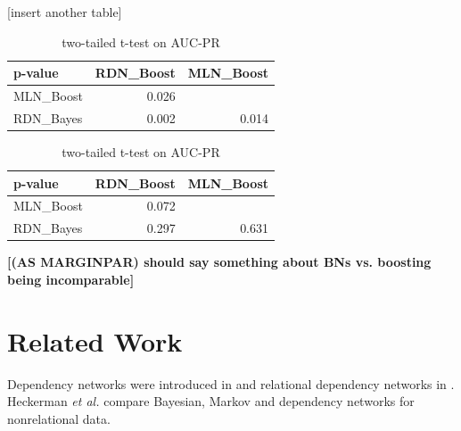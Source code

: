 \documentclass[runningheads,a4paper]{llncs}
\renewcommand{\marginpar}[1]{\fixneeded{(AS MARGINPAR) #1}}
\newcommand{\fixneeded}[1]{\textbf{[\footnotesize #1]}}
\begin{document}
 [insert another table]
\begin{table}[!htb]
    \begin{minipage}{.5\linewidth}
      \caption{ two-tailed  t-test  on CLL}
      \centering
        \begin{tabular}{|l|r|r|} \hline
    \textbf{p-value} &RDN\_Boost   &MLN\_Boost    \\ \hline
    MLN\_Boost &0.026  &             \\
    RDN\_Bayes & 0.002 & 0.014  \\ \hline
    \end{tabular}%
  \label{table:ttestcll}%
    \end{minipage}%
    \begin{minipage}{.5\linewidth}
      \centering
        \caption{ two-tailed  t-test  on AUC-PR}
       \begin{tabular}{|l|r|r|} \hline
    \textbf{p-value} &RDN\_Boost   &MLN\_Boost    \\ \hline
    MLN\_Boost &0.072  &             \\
    RDN\_Bayes & 0.297 & 0.631  \\ \hline
    \end{tabular}%
  \label{table:ttestpr}%
    \end{minipage} 
\end{table} 
 
 
 \marginpar{should say something about BNs vs. boosting being incomparable}


\section{Related Work}
Dependency networks were introduced in \cite{Heckerman2000} and relational dependency networks in \cite{Neville2007}. 
Heckerman {\em et al.} compare Bayesian, Markov and dependency networks for nonrelational data. 
\end{document}
